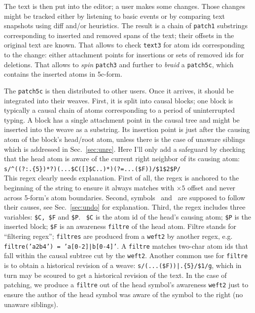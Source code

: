 \documentclass{sig-alternate}
\begin{document}
The text is then put into the editor; a user makes some changes.
Those changes might be tracked either by listening to  basic events or by comparing text snapshots using diff and/or heuristics.
The result is a chain of {\tt patch1} substrings corresponding to inserted and removed spans of the text; their offsets in the original text are known.
That allows to check {\tt text3} for atom ids corresponding to the change: either attachment points for insertions or sets of removed ids for deletions.
That allows to \emph{spin} {\tt patch3} and further to \emph{braid} a {\tt patch5c}, which contains the inserted atoms in 5c-form. 

The {\tt patch5c} is then distributed to other users. Once it arrives, it should be integrated into their weaves.
First, it is split into causal blocks; one block is typically a causal chain of atoms corresponding to a period of uninterrupted typing.
A block has a single attachment point in the causal tree and might be inserted into the weave as a substring.
Its insertion point is just after the causing atom of the block's head/root atom, unless there is the case of unaware siblings which is addressed in Sec.~\ref{sec:unre}. Here I'll only add a safeguard by checking that the head atom is aware of the current right neighbor of its causing atom: \\
{\small \verb`s/^((?:.{5})*?)(...$C([`\bsp\cnc\verb`]$C..)*)(?=...($F))/$1$2$P/`}\\
This regex clearly needs explanation.
First of all, the regex is anchored to the beginning of the string to ensure it always matches with $\times 5$ offset and never across 5-form's atom boundaries.
Second, symbols \bsp~and \cnc~are supposed to follow their causes, see Sec.~\ref{sec:undo} for explanation.
Third, the regex includes three variables: \verb+$C, $F+ and \verb+$P+.
~\verb+$C+ is the atom id of the head's causing atom; \verb+$P+ is the inserted block; \verb+$F+ is an awareness {\tt filtre} of the head atom.
Filtre stands for ``filtering regex''; {\tt filtres} are produced from a {\tt weft2} by another regex, e.g. {\tt filtre('a2b4') = 'a[0-2]|b[0-4]'}.
A {\tt filtre} matches two-char atom ids that fall within the causal subtree cut by the {\tt weft2}.
Another common use for {\tt filtre} is to obtain a historical revision of a weave:  {\small \verb`s/(...($F))|.{5}/$1/g`}, which in turn may be scoured to get a historical revision of the text.
In the case of patching, we produce a {\tt filtre} out of the head symbol's awareness {\tt weft2} just to ensure the author of the head symbol was aware of the symbol to the right (no unaware siblings).
\end{document}

